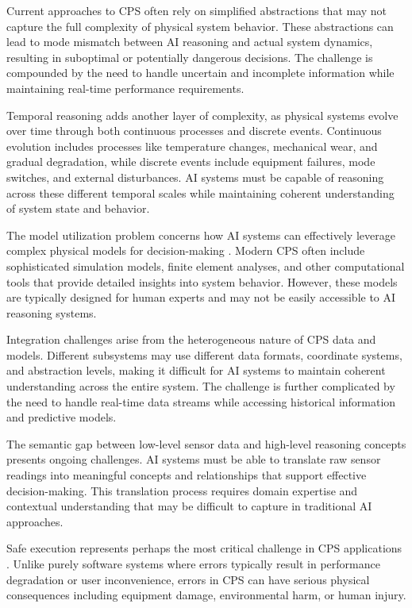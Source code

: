 Current approaches to CPS often rely on simplified abstractions that may not capture the full complexity of physical system behavior. These abstractions can lead to mode mismatch between AI reasoning and actual system dynamics, resulting in suboptimal or potentially dangerous decisions. The challenge is compounded by the need to handle uncertain and incomplete information while maintaining real-time performance requirements.

Temporal reasoning adds another layer of complexity, as physical systems evolve over time through both continuous processes and discrete events. Continuous evolution includes processes like temperature changes, mechanical wear, and gradual degradation, while discrete events include equipment failures, mode switches, and external disturbances. AI systems must be capable of reasoning across these different temporal scales while maintaining coherent understanding of system state and behavior.

The model utilization problem concerns how AI systems can effectively leverage complex physical models for decision-making \cite{negri2017review, tao2019digital}. Modern CPS often include sophisticated simulation models, finite element analyses, and other computational tools that provide detailed insights into system behavior. However, these models are typically designed for human experts and may not be easily accessible to AI reasoning systems.

Integration challenges arise from the heterogeneous nature of CPS data and models. Different subsystems may use different data formats, coordinate systems, and abstraction levels, making it difficult for AI systems to maintain coherent understanding across the entire system. The challenge is further complicated by the need to handle real-time data streams while accessing historical information and predictive models.

The semantic gap between low-level sensor data and high-level reasoning concepts presents ongoing challenges. AI systems must be able to translate raw sensor readings into meaningful concepts and relationships that support effective decision-making. This translation process requires domain expertise and contextual understanding that may be difficult to capture in traditional AI approaches.

Safe execution represents perhaps the most critical challenge in CPS applications \cite{leveson2011engineering, knight2002safety}. Unlike purely software systems where errors typically result in performance degradation or user inconvenience, errors in CPS can have serious physical consequences including equipment damage, environmental harm, or human injury.

